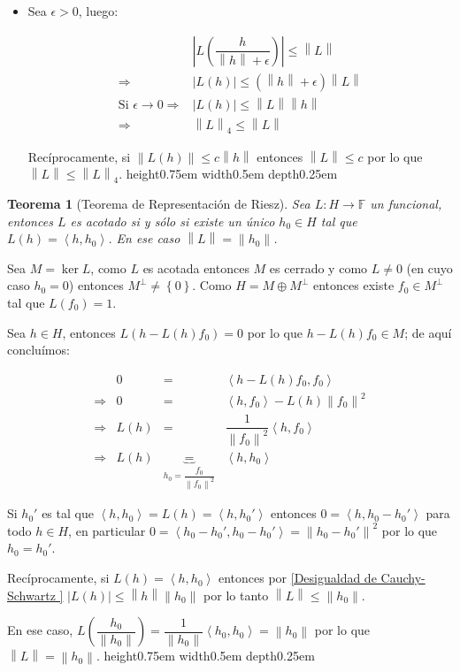 \documentclass[11pt]{article}
\newcommand{\norm}[1]{\left\lVert#1\right\rVert}
\newcommand{\abs}[1]{\left\lvert#1\right\rvert}
\newcommand{\ip}[1]{\left\langle#1\right\rangle}
\newcommand{\sett}[1]{\left\lbrace#1\right\rbrace}
\newtheorem{theorem}{Teorema}
\numberwithin{theorem}{subsection}
\newenvironment{proof}[1][Demostraci\'on]{\begin{trivlist}
		\item[\hskip \labelsep {\bfseries #1}]}{\end{trivlist}}
\newcommand{\qed}{\nobreak \ifvmode \relax \else
	\ifdim\lastskip<1.5em \hskip-\lastskip
	\hskip1.5em plus0em minus0.5em \fi \nobreak
	\vrule height0.75em width0.5em depth0.25em\fi}
\begin{document}
\begin{proof}
\begin{itemize}
		\item Sea $\epsilon > 0$, luego:
		
		\begin{equation*}
		\begin{array}{cc}
		& \abs{L\left(\dfrac{h}{\norm{h} + \epsilon}\right)} \leq \norm{L} \\
		\Longrightarrow  & \abs{L(h)} \leq \left(\norm{h} + \epsilon\right) \norm{L} \\
		\text{Si } \epsilon \rightarrow 0 \Longrightarrow  & \abs{L(h)} \leq \norm{L} \norm{h} \\
		\Longrightarrow  & \norm{L}_4 \leq \norm{L}
		\end{array}
		\end{equation*}
		
		Rec\'iprocamente, si $\norm{L(h)} \leq c \norm{h}$ entonces $\norm{L} \leq c$ por lo que $\norm{L} \leq \norm{L}_4$. \qed
		
	\end{itemize}
\end{proof}

\begin{theorem}[Teorema de Representaci\'on de Riesz]
	Sea $L : H \rightarrow \mathbb{F}$ un funcional, entonces $L$ es acotado si y s\'olo si existe un \'unico $h_0 \in H$ tal que $L(h) = \ip{h,h_0}$. En ese caso $\norm{L} = \norm{h_0}$.
\end{theorem}

\begin{proof}
	Sea $M = \ker L$, como $L$ es acotada entonces $M$ es cerrado y como $L \neq 0$ (en cuyo caso $h_0 = 0$) entonces $M^{\perp} \neq \sett{0}$. Como $H = M \oplus M^{\perp}$ entonces existe $f_0 \in M^{\perp}$ tal que $L(f_0) = 1$.
	
	Sea $h \in H$, entonces $L(h - L(h)f_0) = 0$ por lo que $h - L(h)f_0 \in M$; de aqu\'i conclu\'imos:
	
	\begin{equation*}
	\begin{array}{cccc}
	& 0 & = & \ip{h - L(h)f_0, f_0} \\
	\Longrightarrow & 0 & = & \ip{h,f_0} - L(h)\norm{f_0}^2 \\
	\Longrightarrow & L(h) & = & \dfrac{1}{\norm{f_0}^2}\ip{h,f_0} \\
	\Longrightarrow & L(h) & \underbrace{=}_{h_0 = \dfrac{f_0}{\norm{f_0}^2}} & \ip{h,h_0} 
	\end{array}
	\end{equation*}
	
	Si $h_0'$ es tal que $\ip{h,h_0} = L(h) = \ip{h,h_0'}$ entonces $0 = \ip{h,h_0 - h_0'}$ para todo $h \in H$, en particular $0 = \ip{h_0 - h_0',h_0 - h_0'} = \norm{h_0 - h_0'}^2$ por lo que $h_0 = h_0'$.
	
	Rec\'iprocamente, si $L(h) = \ip{h,h_0}$ entonces por \ref{Desigualdad de Cauchy-Schwartz } $\abs{L(h)} \leq \norm{h} \norm{h_0}$ por lo tanto $\norm{L} \leq \norm{h_0}$.
	
	En ese caso, $L\left(\dfrac{h_0}{\norm{h_0}}\right) = \dfrac{1}{\norm{h_0}}\ip{h_0,h_0} = \norm{h_0}$ por lo que $\norm{L} = \norm{h_0}$. \qed
	
\end{proof}
\end{document}
